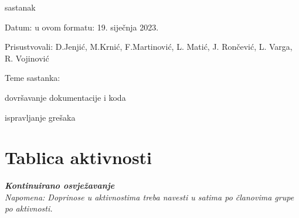 \begin{packed_enum}
			
			
			\item  sastanak
			\item[] \begin{packed_item}
				\item Datum: u ovom formatu: 19. siječnja 2023.
				\item Prisustvovali: D.Jenjić, M.Krnić, F.Martinović, L. Matić, J. Rončević, L. Varga, R. Vojinović
				\item Teme sastanka:
				\begin{packed_item}
					\item  dovršavanje dokumentacije i koda
					\item  ispravljanje grešaka
				\end{packed_item}
			\end{packed_item}
			
			
			
		\end{packed_enum}
		
		\eject
		\section*{Tablica aktivnosti}
		
			\textbf{\textit{Kontinuirano osvježavanje}}\\
			
			 \textit{Napomena: Doprinose u aktivnostima treba navesti u satima po članovima grupe po aktivnosti.}

